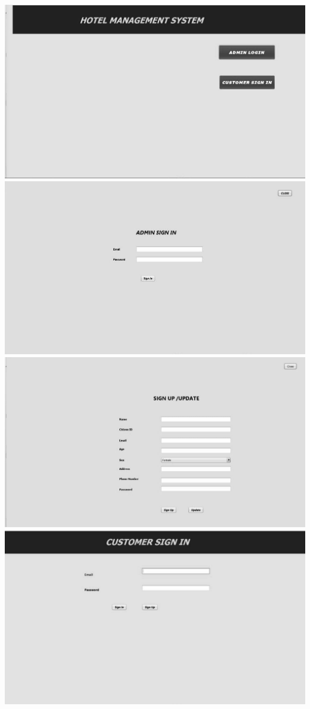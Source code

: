 \documentclass[a4paper,12pt]{report}
\begin{document}
\includegraphics[scale=0.3]{wf1.jpg}
\includegraphics[scale=0.3]{wf2.jpg}
\includegraphics[scale=0.3]{wf3.jpg}
\includegraphics[scale=0.3]{wf4.jpg}
\end{document}
